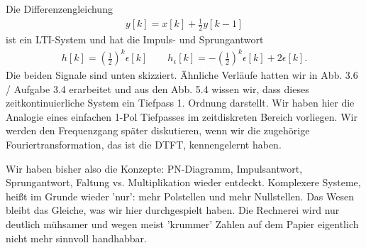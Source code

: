 \begin{Loesung}
Die Differenzengleichung
\begin{align}
y[k] = x[k] + \frac{1}{2} y[k-1]
\end{align}
ist ein LTI-System und hat die Impuls- und Sprungantwort
\begin{align}
h[k] = \left(\frac{1}{2}\right)^k \epsilon[k]\qquad
h_\epsilon[k] = - \left(\frac{1}{2}\right)^k \epsilon[k] + 2 \epsilon[k].
\end{align}
Die beiden Signale sind unten skizziert. Ähnliche Verläufe hatten wir in
Abb. 3.6 / Aufgabe 3.4 erarbeitet und aus den Abb. 5.4 wissen wir, dass dieses
zeitkontinuierliche System ein Tiefpass 1. Ordnung darstellt.
%
Wir haben hier die Analogie eines einfachen 1-Pol Tiefpasses im zeitdiskreten
Bereich vorliegen. Wir werden den Frequenzgang später diskutieren, wenn
wir die zugehörige Fouriertransformation, das ist die DTFT, kennengelernt haben.
%
%
Wir haben bisher also die Konzepte: PN-Diagramm, Impulsantwort, Sprungantwort,
Faltung vs. Multiplikation wieder entdeckt.
%
Komplexere Systeme, heißt im Grunde wieder 'nur': mehr Polstellen und mehr
Nullstellen. Das Wesen bleibt das Gleiche, was wir hier durchgespielt
haben. Die Rechnerei wird nur deutlich mühsamer und wegen meist 'krummer' Zahlen
auf dem Papier eigentlich nicht mehr sinnvoll handhabbar.


\end{Loesung}
